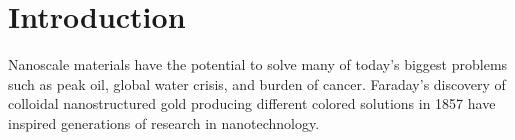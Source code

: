 \section{Introduction}

Nanoscale materials have the potential to solve many of today's biggest problems such as peak oil, global water crisis, and burden of cancer.
Faraday's discovery of colloidal nanostructured gold producing different colored solutions in 1857 have inspired generations of research in nanotechnology.